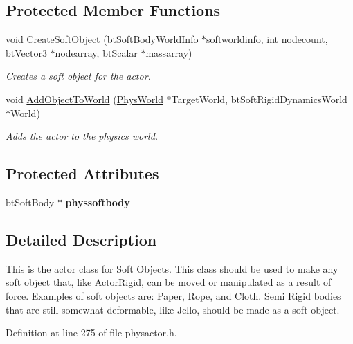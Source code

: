 \subsection*{Protected Member Functions}
\begin{DoxyCompactItemize}
\item 
void \hyperlink{classActorSoft_a01a570c728d6cb96d1a40003d6b17e22}{CreateSoftObject} (btSoftBodyWorldInfo $\ast$softworldinfo, int nodecount, btVector3 $\ast$nodearray, btScalar $\ast$massarray)
\begin{DoxyCompactList}\small\item\em Creates a soft object for the actor. \item\end{DoxyCompactList}\item 
void \hyperlink{classActorSoft_a0def29f28ed4d126a0634ddc97e33e2f}{AddObjectToWorld} (\hyperlink{classPhysWorld}{PhysWorld} $\ast$TargetWorld, btSoftRigidDynamicsWorld $\ast$World)
\begin{DoxyCompactList}\small\item\em Adds the actor to the physics world. \item\end{DoxyCompactList}\end{DoxyCompactItemize}
\subsection*{Protected Attributes}
\begin{DoxyCompactItemize}
\item 
\hypertarget{classActorSoft_aa7d4efd5150008eecc54e070be075700}{
btSoftBody $\ast$ {\bfseries physsoftbody}}
\label{d5/da4/classActorSoft_aa7d4efd5150008eecc54e070be075700}

\end{DoxyCompactItemize}


\subsection{Detailed Description}
This is the actor class for Soft Objects. This class should be used to make any soft object that, like \hyperlink{classActorRigid}{ActorRigid}, can be moved or manipulated as a result of force. Examples of soft objects are: Paper, Rope, and Cloth. Semi Rigid bodies that are still somewhat deformable, like Jello, should be made as a soft object. 

Definition at line 275 of file physactor.h.

